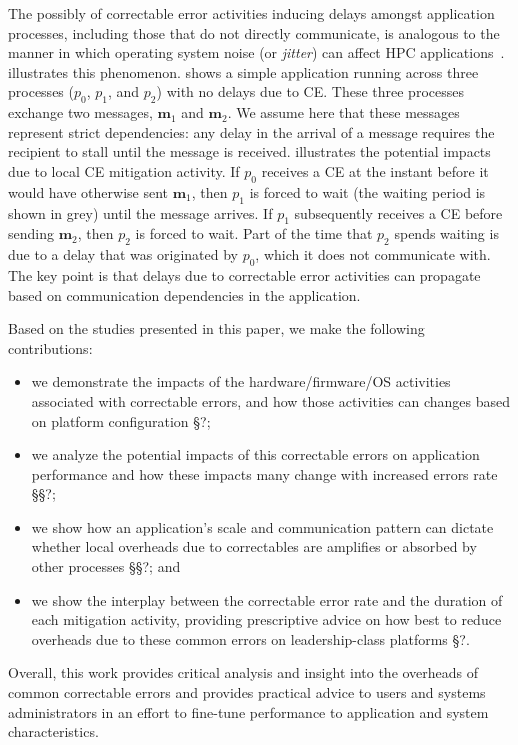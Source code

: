 The possibly of correctable error activities inducing delays amongst application
processes, including those that do not directly communicate, is analogous to the
manner in which operating system noise (or \emph{jitter}) can affect HPC
applications~\cite{Hoefler:2010:Characterizing, Ferreira:08:characterizing}.
 illustrates this phenomenon.   shows
a simple application running across three processes ($p_0$, $p_1$, and $p_2$)
with no delays due to CE.  These three processes exchange two messages,
$\mathbf{m}_1$ and $\mathbf{m}_2$.  We assume here that these messages represent
strict dependencies: any delay in the arrival of a message requires the
recipient to stall until the message is received. 
illustrates the potential impacts due to local CE mitigation activity.  If $p_0$
receives a CE at the instant before it would have otherwise sent $\mathbf{m}_1$,
then $p_1$ is forced to wait (the waiting period is shown in grey) until the
message arrives.  If $p_1$ subsequently receives a CE before sending
$\mathbf{m}_2$, then $p_2$ is forced to wait.  Part of the time that $p_2$
spends waiting is due to a delay that was originated by $p_0$, which it does not
communicate with.  The key point is that delays due to correctable error
activities can propagate based on communication dependencies in the application.

Based on the studies presented in this paper, we make the following
contributions:

\begin{itemize}

\item we demonstrate the impacts of the hardware/firmware/OS activities
        associated with correctable errors, and how those activities can changes
        based on platform configuration \S{?};

\item we analyze the potential impacts of this correctable errors on application
        performance and how these impacts many change with increased errors rate
        \S\S{?};

\item we show how an application's scale and communication pattern can dictate
        whether local overheads due to correctables are amplifies or absorbed by
        other processes \S\S{?}; and

\item we show the interplay between the correctable error rate and the duration
        of each mitigation activity, providing prescriptive advice on how best
        to reduce overheads due to these common errors on leadership-class platforms
        \S{?}.

\end{itemize}

Overall, this work provides critical analysis and insight into the overheads of
common correctable errors and provides practical advice to users and systems
administrators in an effort to fine-tune performance to application and system
characteristics.

